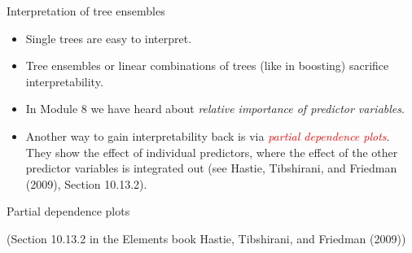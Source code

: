 \documentclass[
  10pt,
  ignorenonframetext,
]{beamer}
\providecommand{\tightlist}{%
  \setlength{\itemsep}{0pt}\setlength{\parskip}{0pt}}
\begin{document}
\begin{frame}{Interpretation of tree ensembles}
\protect\hypertarget{interpretation-of-tree-ensembles}{}
\(~\)

\begin{itemize}
\tightlist
\item
  Single trees are easy to interpret.
\end{itemize}

\vspace{2mm}

\begin{itemize}
\tightlist
\item
  Tree ensembles or linear combinations of trees (like in boosting)
  sacrifice interpretability.
\end{itemize}

\vspace{2mm}

\begin{itemize}
\tightlist
\item
  In Module 8 we have heard about \emph{relative importance of predictor
  variables}.
\end{itemize}

\vspace{2mm}

\begin{itemize}
\tightlist
\item
  Another way to gain interpretability back is via
  \emph{\textcolor{red}{partial dependence plots}}. They show the effect
  of individual predictors, where the effect of the other predictor
  variables is integrated out (see Hastie, Tibshirani, and Friedman
  (2009), Section 10.13.2).
\end{itemize}
\end{frame}

\begin{frame}
\begin{block}{Partial dependence plots}
\protect\hypertarget{partial-dependence-plots}{}
\scriptsize

(Section 10.13.2 in the Elements book Hastie, Tibshirani, and Friedman
(2009)) \(~\)

\normalsize
\end{block}
\end{frame}
\end{document}
